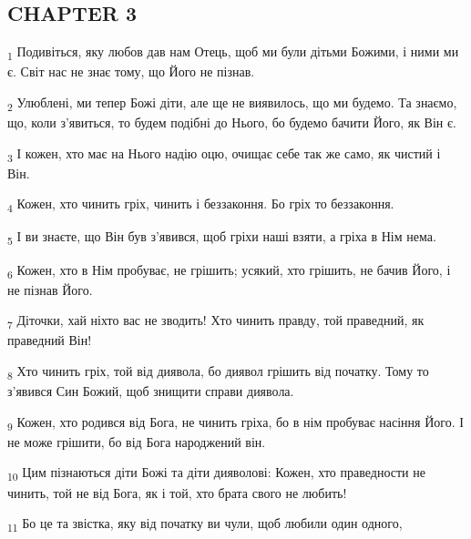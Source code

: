 \subsection{CHAPTER 3}
\begin{tcolorbox}
\textsubscript{1} Подивіться, яку любов дав нам Отець, щоб ми були дітьми Божими, і ними ми є. Світ нас не знає тому, що Його не пізнав.
\end{tcolorbox}
\begin{tcolorbox}
\textsubscript{2} Улюблені, ми тепер Божі діти, але ще не виявилось, що ми будемо. Та знаємо, що, коли з'явиться, то будем подібні до Нього, бо будемо бачити Його, як Він є.
\end{tcolorbox}
\begin{tcolorbox}
\textsubscript{3} І кожен, хто має на Нього надію оцю, очищає себе так же само, як чистий і Він.
\end{tcolorbox}
\begin{tcolorbox}
\textsubscript{4} Кожен, хто чинить гріх, чинить і беззаконня. Бо гріх то беззаконня.
\end{tcolorbox}
\begin{tcolorbox}
\textsubscript{5} І ви знаєте, що Він був з'явився, щоб гріхи наші взяти, а гріха в Нім нема.
\end{tcolorbox}
\begin{tcolorbox}
\textsubscript{6} Кожен, хто в Нім пробуває, не грішить; усякий, хто грішить, не бачив Його, і не пізнав Його.
\end{tcolorbox}
\begin{tcolorbox}
\textsubscript{7} Діточки, хай ніхто вас не зводить! Хто чинить правду, той праведний, як праведний Він!
\end{tcolorbox}
\begin{tcolorbox}
\textsubscript{8} Хто чинить гріх, той від диявола, бо диявол грішить від початку. Тому то з'явився Син Божий, щоб знищити справи диявола.
\end{tcolorbox}
\begin{tcolorbox}
\textsubscript{9} Кожен, хто родився від Бога, не чинить гріха, бо в нім пробуває насіння Його. І не може грішити, бо від Бога народжений він.
\end{tcolorbox}
\begin{tcolorbox}
\textsubscript{10} Цим пізнаються діти Божі та діти дияволові: Кожен, хто праведности не чинить, той не від Бога, як і той, хто брата свого не любить!
\end{tcolorbox}
\begin{tcolorbox}
\textsubscript{11} Бо це та звістка, яку від початку ви чули, щоб любили один одного,
\end{tcolorbox}
